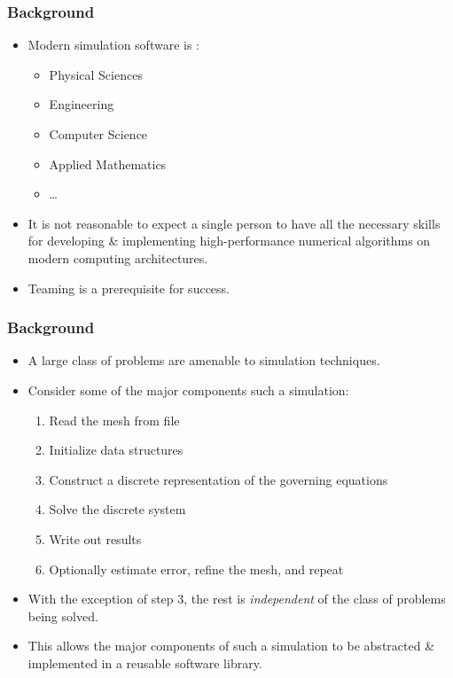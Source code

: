  

\frame
{
  \frametitle{Background}                 

  \begin{itemize}
  \item Modern simulation software is :
    \begin{itemize}
    \item Physical Sciences
    \item Engineering
    \item Computer Science
    \item Applied Mathematics
    \item \ldots
    \end{itemize}
  \item It is not reasonable to expect a single person to have all the necessary skills for developing \& implementing high-performance numerical algorithms on modern computing architectures.
  \item Teaming is a prerequisite for success.
  \end{itemize}
}


 

\frame
{
  \frametitle{Background}                 
  \begin{itemize}
    \item A large class of problems are amenable to  simulation techniques.
    \item Consider some of the major components such a simulation:
      \pause
      \begin{enumerate}
        \item Read the mesh from file
        \item Initialize data structures
        \item Construct a discrete representation of the governing equations
        \item Solve the discrete system
        \item Write out results
        \item Optionally estimate error, refine the mesh, and repeat
      \end{enumerate}

    \pause
    \item With the exception of step 3, the rest is \emph{independent} of the class of problems being solved.
    \pause
    \item This allows the major components of such a simulation to be abstracted \& implemented in a reusable software library.
  \end{itemize}
}


